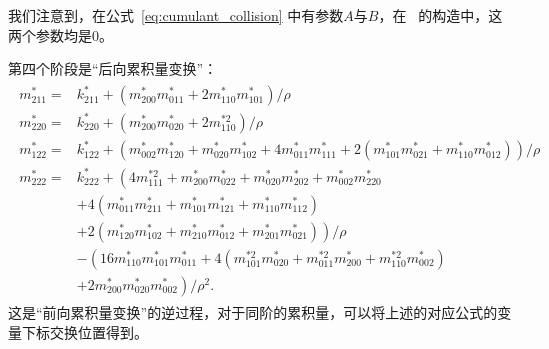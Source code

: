 我们注意到，在公式~\ref{eq:cumulant_collision} 中有参数$A$与$B$，在~\citep{Geier-2015} 的构造中，这两个参数均是0。

第四个阶段是“后向累积量变换”：
\begin{align}
    \begin{split}
m_{211}^{*}= & k_{211}^{*}+\left(m_{200}^{*} m_{011}^{*}+2 m_{110}^{*} m_{101}^{*}\right) / \rho \\
m_{220}^{*}= & k_{220}^{*}+\left(m_{200}^{*} m_{020}^{*}+2 m_{110}^{* 2}\right) / \rho \\
m_{122}^{*}= & k_{122}^{*}+\left(m_{002}^{*} m_{120}^{*}+m_{020}^{*} m_{102}^{*}+4 m_{011}^{*} m_{111}^{*}+2\left(m_{101}^{*} m_{021}^{*}+m_{110}^{*} m_{012}^{*}\right)\right) / \rho \\
m_{222}^{*}= & k_{222}^{*}+\left(4 m_{111}^{* 2}+m_{200}^{*} m_{022}^{*}+m_{020}^{*} m_{202}^{*}+m_{002}^{*} m_{220}^{*}\right. \\
& +4\left(m_{011}^{*} m_{211}^{*}+m_{101}^{*} m_{121}^{*}+m_{110}^{*} m_{112}^{*}\right) \\
& \left.+2\left(m_{120}^{*} m_{102}^{*}+m_{210}^{*} m_{012}^{*}+m_{201}^{*} m_{021}^{*}\right)\right) / \rho \\
& -\left(16 m_{110}^{*} m_{101}^{*} m_{011}^{*}+4\left(m_{101}^{* 2} m_{020}^{*}+m_{011}^{* 2} m_{200}^{*}+m_{110}^{* 2} m_{002}^{*}\right)\right. \\
& \left.+2 m_{200}^{*} m_{020}^{*} m_{002}^{*}\right) / \rho^{2} .
\end{split}
\end{align}
这是“前向累积量变换”的逆过程，对于同阶的累积量，可以将上述的对应公式的变量下标交换位置得到。

